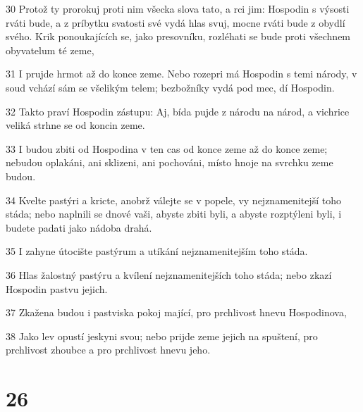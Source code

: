 \par 30 Protož ty prorokuj proti nim všecka slova tato, a rci jim: Hospodin s výsosti rváti bude, a z príbytku svatosti své vydá hlas svuj, mocne rváti bude z obydlí svého. Krik ponoukajících se, jako presovníku, rozléhati se bude proti všechnem obyvatelum té zeme,
\par 31 I prujde hrmot až do konce zeme. Nebo rozepri má Hospodin s temi národy, v soud vchází sám se všelikým telem; bezbožníky vydá pod mec, dí Hospodin.
\par 32 Takto praví Hospodin zástupu: Aj, bída pujde z národu na národ, a vichrice veliká strhne se od koncin zeme.
\par 33 I budou zbiti od Hospodina v ten cas od konce zeme až do konce zeme; nebudou oplakáni, ani sklizeni, ani pochováni, místo hnoje na svrchku zeme budou.
\par 34 Kvelte pastýri a kricte, anobrž válejte se v popele, vy nejznamenitejší toho stáda; nebo naplnili se dnové vaši, abyste zbiti byli, a abyste rozptýleni byli, i budete padati jako nádoba drahá.
\par 35 I zahyne útocište pastýrum a utíkání nejznamenitejším toho stáda.
\par 36 Hlas žalostný pastýru a kvílení nejznamenitejších toho stáda; nebo zkazí Hospodin pastvu jejich.
\par 37 Zkažena budou i pastviska pokoj mající, pro prchlivost hnevu Hospodinova,
\par 38 Jako lev opustí jeskyni svou; nebo prijde zeme jejich na spuštení, pro prchlivost zhoubce a pro prchlivost hnevu jeho.

\chapter{26}

